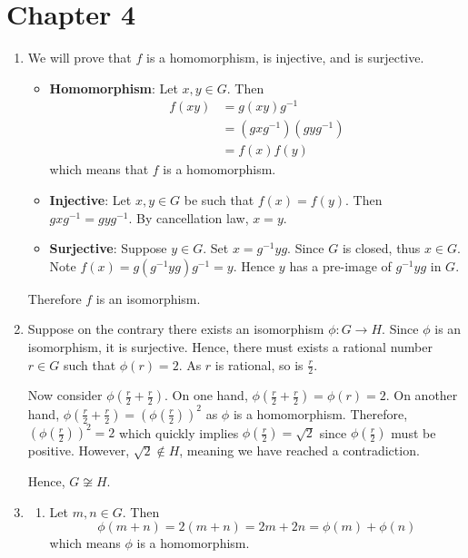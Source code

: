 \section*{Chapter 4}
\begin{enumerate}
    \item We will prove that $f$ is a homomorphism, is injective, and is surjective.
    \begin{itemize}
        \item \textbf{Homomorphism}: Let $x, y \in G$. Then
        \begin{align*}
            f(xy) &= g(xy)g^{-1}\\
            &= (gxg^{-1})(gyg^{-1})\\
            &= f(x)f(y)
        \end{align*}
        which means that $f$ is a homomorphism.
        \item \textbf{Injective}: Let $x, y \in G$ be such that $f(x) = f(y)$. Then $gxg^{-1} = gyg^{-1}$. By cancellation law, $x = y$.
        \item \textbf{Surjective}: Suppose $y \in G$. Set $x = g^{-1}yg$. Since $G$ is closed, thus $x \in G$. Note $f(x) = g(g^{-1}yg)g^{-1} = y$. Hence $y$ has a pre-image of $g^{-1}yg$ in $G$.
    \end{itemize}
    Therefore $f$ is an isomorphism.

    \item Suppose on the contrary there exists an isomorphism $\phi: G \to H$. Since $\phi$ is an isomorphism, it is surjective. Hence, there must exists a rational number $r \in G$ such that $\phi(r) = 2$. As $r$ is rational, so is $\frac r2$.

    Now consider $\phi\left(\frac r2 + \frac r2\right)$. On one hand, $\phi\left(\frac r2 + \frac r2\right) = \phi(r) = 2$. On another hand, $\phi(\frac r2 + \frac r2) = \left(\phi\left(\frac r2\right)\right)^2$ as $\phi$ is a homomorphism. Therefore, $\left(\phi\left(\frac r2\right)\right)^2 = 2$ which quickly implies $\phi\left(\frac r2\right) = \sqrt 2$ since $\phi\left(\frac r2\right)$ must be positive. However, $\sqrt 2 \notin H$, meaning we have reached a contradiction.

    Hence, $G \not\cong H$.

    \item \begin{enumerate}[label=(\alph*)]
        \item Let $m, n \in G$. Then
        \[
            \phi(m + n) = 2(m + n) = 2m + 2n = \phi(m) + \phi(n)
        \]
        which means $\phi$ is a homomorphism.


\end{enumerate}
\end{enumerate}
